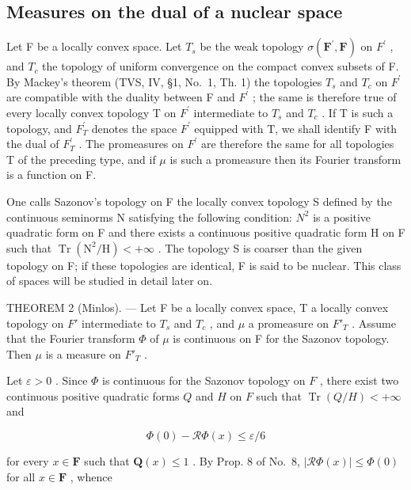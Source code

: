 \subsection{Measures on the dual of a nuclear space}

Let F be a locally convex space. Let \(T_{s}\) be the weak topology \(\sigma(\mathbf{F}^{\prime},\mathbf{F})\) on \(F^{\prime}\) , and \(T_{c}\) the topology of uniform convergence on the compact convex subsets of F. By Mackey's theorem (TVS, IV, §1, No.~1, Th. 1) the topologies \(T_{s}\) and \(T_{c}\) on \(F^{\prime}\) are compatible with the duality between F and \(F^{\prime}\) ; the same is therefore true of every locally convex topology T on \(F^{\prime}\) intermediate to \(T_{s}\) and \(T_{c}\) . If T is such a topology, and \(F^{\prime}_{T}\) denotes the space \(F^{\prime}\) equipped with T, we shall identify F with the dual of \(F^{\prime}_{T}\) . The promeasures on \(F^{\prime}\) are therefore the same for all topologies T of the preceding type, and if \(\mu\) is such a promeasure then its Fourier transform is a function on F.

One calls Sazonov's topology on F the locally convex topology S defined by the continuous seminorms N satisfying the following condition: \(N^{2}\) is a positive quadratic form on F and there exists a continuous positive quadratic form H on F such that \(\operatorname{Tr}\left(\mathrm{N}^{2}/\mathrm{H}\right)<+\infty\) . The topology S is coarser than the given topology on F; if these topologies are identical, F is said to be nuclear. This class of spaces will be studied in detail later on.

THEOREM 2 (Minlos). --- Let F be a locally convex space, T a locally convex topology on \(F'\) intermediate to \(T_{s}\) and \(T_{c}\) , and \(\mu\) a promeasure on \(F'_{T}\) . Assume that the Fourier transform \(\Phi\) of \(\mu\) is continuous on F for the Sazonov topology. Then \(\mu\) is a measure on \(F'_{T}\) .

Let \(\varepsilon > 0\) . Since \(\Phi\) is continuous for the Sazonov topology on \(F\) , there exist two continuous positive quadratic forms \(Q\) and \(H\) on \(F\) such that \(\operatorname{Tr}(Q / H) < +\infty\) and

\[
\Phi (0) - \mathcal {R} \Phi (x) \leqslant \varepsilon / 6
\]

for every \(x \in \mathbf{F}\) such that \(\mathbf{Q}(x) \leqslant 1\) . By Prop. 8 of No.~8, \(|\mathcal{R}\Phi(x)| \leqslant \Phi(0)\) for all \(x \in \mathbf{F}\) , whence

